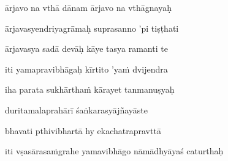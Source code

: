 ārjavo na vthā dānam ārjavo na vthāgnayaḥ \veg\dontdisplaylinenum
            \var{\vcd \om\ \Ed}%

ārjavasyendriyagrāmaḥ suprasanno 'pi tiṣṭhati\thinspace{\dandab} \dontdisplaylinenum
            \var{\vab \om\ \Ed}%

ārjavasya sadā devāḥ kāye tasya ramanti te \veg\dontdisplaylinenum

\ujvers\nemsloka 
iti yamapravibhāgaḥ kīrtito 'ya\.m dvijendra
\dontdisplaylinenum

\nemslokab 
iha parata sukhārtha\.m kārayet tanmanuṣyaḥ \danda\dontdisplaylinenum

\nemslokac 
duritamalaprahārī śaṅkarasyājñayāste
\dontdisplaylinenum

\nemslokad 
bhavati pthivibhartā hy ekachatrapravttā \veg\dontdisplaylinenum

\vers


\jump
\begin{center}
\ketdanda iti vṣasārasa\.mgrahe yamavibhāgo nāmādhyāyaś caturthaḥ\ketdanda
\end{center}
\dontdisplaylinenum\vers 

\vers

\vers

\vers

\vers

\vers

\vers

\vers

\vers

\vers

\vers

\vers

\vers

\vers

\vers

\vers

\vers

\vers

\vers


